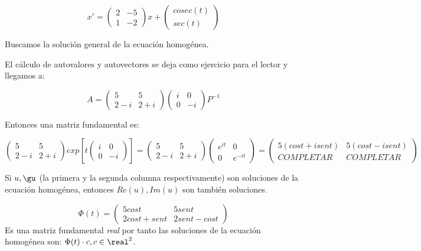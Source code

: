 \documentclass[nochap]{apuntes}
\begin{document}
\begin{problem}[31]
\[x'=\begin{pmatrix}
2&-5\\1&-2
\end{pmatrix}x + \begin{pmatrix}
cosec(t)\\sec(t)
\end{pmatrix}\]

\solution

Buscamos la solución general de la ecuación homogénea.

El cálculo de autovalores y autovectores se deja como ejercicio para el lector y llegamos a:

\[A = \begin{pmatrix}
5&5\\2-i&2+i
\end{pmatrix}\begin{pmatrix}
i&0\\0&-i
\end{pmatrix}
P^{-1}\]

Entonces una matriz fundamental es:

\[\begin{pmatrix}
5&5\\2-i&2+i
\end{pmatrix}
exp\left[t\begin{pmatrix}i&0\\0&-i\end{pmatrix} \right]
=\begin{pmatrix}
5&5\\2-i&2+i
\end{pmatrix}
\begin{pmatrix}
e^{it}&0\\0&e^{-it}
\end{pmatrix}
=\begin{pmatrix}
5(cost+isent)&5(cost-isent)\\
COMPLETAR&COMPLETAR
\end{pmatrix}
\]

Si $u,\gu$ (la primera y la segunda columna respectivamente) son soluciones de la ecuación homogénea, entonces $Re(u),Im(u)$ son también soluciones.

\[\Phi(t) = \begin{pmatrix}
5cost&5sent\\2cost+sent&2sent-cost
\end{pmatrix}\] Es una matriz fundamental \textit{real} por tanto las soluciones de la ecuación homogénea son:
$\Phi(t)\cdot c,c\in\real^2$.


\end{problem}
\end{document}
